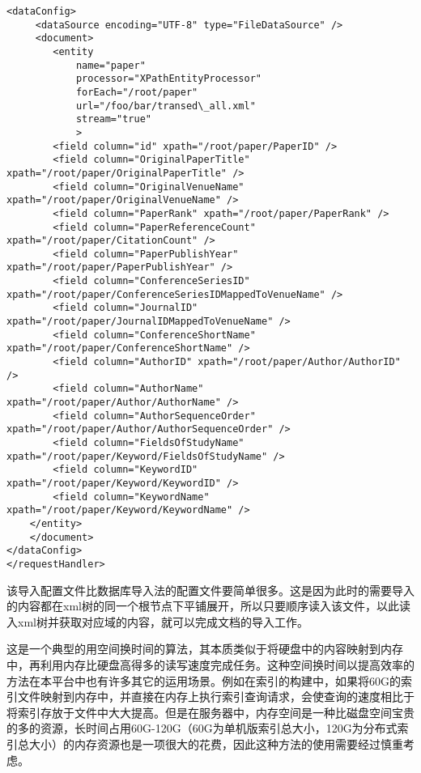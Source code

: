 \begin{lstlisting}[caption={从文件导入索引的db-data-config.xml}, label=filetoindex, escapeinside="", numbers=none]
<dataConfig>
	 <dataSource encoding="UTF-8" type="FileDataSource" />
	 <document>
	    <entity
	        name="paper"
			processor="XPathEntityProcessor"
			forEach="/root/paper"
			url="/foo/bar/transed\_all.xml"
			stream="true"
			>
		<field column="id" xpath="/root/paper/PaperID" />
		<field column="OriginalPaperTitle" xpath="/root/paper/OriginalPaperTitle" />
		<field column="OriginalVenueName" xpath="/root/paper/OriginalVenueName" />
		<field column="PaperRank" xpath="/root/paper/PaperRank" />
		<field column="PaperReferenceCount" xpath="/root/paper/CitationCount" />
		<field column="PaperPublishYear" xpath="/root/paper/PaperPublishYear" />
		<field column="ConferenceSeriesID" xpath="/root/paper/ConferenceSeriesIDMappedToVenueName" />
		<field column="JournalID" xpath="/root/paper/JournalIDMappedToVenueName" />
		<field column="ConferenceShortName" xpath="/root/paper/ConferenceShortName" />
		<field column="AuthorID" xpath="/root/paper/Author/AuthorID" />
		<field column="AuthorName" xpath="/root/paper/Author/AuthorName" />
		<field column="AuthorSequenceOrder" xpath="/root/paper/Author/AuthorSequenceOrder" />
		<field column="FieldsOfStudyName" xpath="/root/paper/Keyword/FieldsOfStudyName" />
		<field column="KeywordID" xpath="/root/paper/Keyword/KeywordID" />
		<field column="KeywordName" xpath="/root/paper/Keyword/KeywordName" />
    </entity>
    </document>
</dataConfig>
</requestHandler>
\end{lstlisting}

该导入配置文件比数据库导入法的配置文件要简单很多。这是因为此时的需要导入的内容都在xml树的同一个根节点下平铺展开，所以只要顺序读入该文件，以此读入xml树并获取对应域的内容，就可以完成文档的导入工作。

这是一个典型的用空间换时间的算法，其本质类似于将硬盘中的内容映射到内存中，再利用内存比硬盘高得多的读写速度完成任务。这种空间换时间以提高效率的方法在本平台中也有许多其它的运用场景。例如在索引的构建中，如果将60G的索引文件映射到内存中，并直接在内存上执行索引查询请求，会使查询的速度相比于将索引存放于文件中大大提高。但是在服务器中，内存空间是一种比磁盘空间宝贵的多的资源，长时间占用60G-120G（60G为单机版索引总大小，120G为分布式索引总大小）的内存资源也是一项很大的花费，因此这种方法的使用需要经过慎重考虑。
